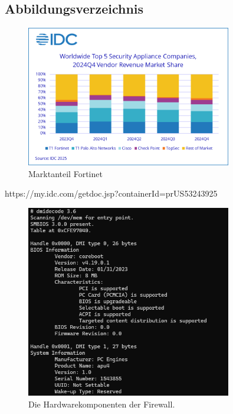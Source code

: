 \documentclass[12pt]{scrreprt}
\begin{document}
\begin{thebibliography}{99}
\chapter{Abbildungsverzeichnis}

	 \begin{figure}[h!]
	\centering
	\includegraphics[width=0.8\textwidth]{Fortinet_Marktanteile.png}
	\caption{Marktanteil Fortinet}
	\label{fig:ER-Modell}
\end{figure}
https://my.idc.com/getdoc.jsp?containerId=prUS53243925


\begin{figure}[htbp]
	\centering
	\includegraphics[width=0.8\textwidth]{opnsense-hardware.png}
	\caption{Die Hardwarekomponenten der Firewall.}
	\label{fig:hardware-apu4} %
\end{figure}


\end{thebibliography}
\end{document}
